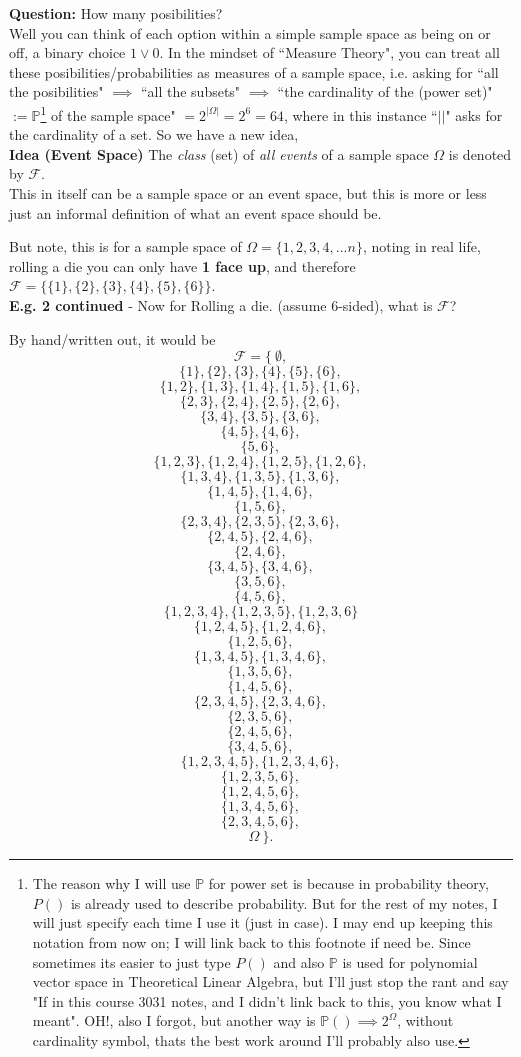 \documentclass[12pt]{book}
\begin{document}
\textbf{Question:} How many posibilities?\\
Well you can think of each option within a simple sample space as being on or off, a binary choice ${1 \lor 0}$. 
In the mindset of ``Measure Theory", you can treat all these posibilities/probabilities as measures of a sample space, i.e. asking for ``all the posibilities" $\implies{}$ ``all the subsets" $\implies{}$ 
``the cardinality of the (power set)"$:=\mathbb{P}$\footnote{The reason why I will use $\mathbb{P}$ for power set is because in probability theory, $P()$ is already used to describe probability. But for the rest of my notes, I will just specify each time I use it (just in case). I may end up keeping this notation from now on; I will link back to this footnote if need be. Since sometimes its easier to just type $P()$ and also $\mathbb{P}$ is used for polynomial vector space in Theoretical Linear Algebra, but I'll just stop the rant and say "If in this course 3031 notes, and I didn't link back to this, you know what I meant". OH!, also I forgot, but another way is $\mathbb{P}() \implies 2^{\Omega}$, without cardinality symbol, thats the best work around I'll probably also use.
} of the sample space" $=2^{|\Omega|}=2^6=64$, where in this instance ``$||$" asks for the cardinality of a set. 
So we have a new idea, \\

\textbf{Idea (Event Space)} The \textit{class} (set) of \textit{all events} of a sample space $\Omega$ is denoted by $\mathcal{F}$.\\

This in itself can be a sample space or an event space, but this is more or less just an informal definition of what an event space should be.

But note, this is for a sample space of $\Omega = \{ 1,2,3,4,...n \}$, noting in real life, rolling a die you can only have \textbf{1 face up}, and therefore $\mathcal{F}= \{ \{1\}, \{2\}, \{3\}, \{4\}, \{5\}, \{6\} \}$.\\

\noindent \textbf{E.g. 2 continued} - Now for Rolling a die. (assume 6-sided), what is $\mathcal{F}$?

By hand/written out, it would be 
$$\mathcal{F}= \Big\{ ~\emptyset,$$
$$\{1\}, \{2\}, \{3\}, \{4\}, \{5\}, \{6\},$$
$$~$$
$$\{1,2\}, \{1,3\}, \{1,4\}, \{1,5\}, \{1,6\}, $$ 
$$\{2,3\}, \{2,4\}, \{2,5\}, \{2,6\},  $$
$$\{3,4\}, \{3,5\}, \{3,6\},  $$
$$\{4,5\}, \{4,6\},  $$
$$\{5,6\},  $$
$$~$$
$$\{1,2,3\}, \{1,2,4\}, \{1,2,5\}, \{1,2,6\},  $$
$$\{1,3,4\}, \{1,3,5\}, \{1,3,6\}, $$
$$\{1,4,5\}, \{1,4,6\}, $$
$$\{1,5,6\},$$
$$\{2,3,4\}, \{2,3,5\},  \{2,3,6\},  $$
$$\{2,4,5\}, \{2,4,6\},$$
$$\{2,4,6\},$$
$$\{3,4,5\}, \{3,4,6\},$$
$$\{3,5,6\}, $$
$$\{4,5,6\},$$
$$~$$
$$\{1,2,3,4\}, \{1,2,3,5\}, \{1,2,3,6\}$$
$$\{1,2,4,5\}, \{1,2,4,6\},$$
$$\{1,2,5,6\},$$
$$\{1,3,4,5\}, \{1,3,4,6\},$$
$$\{1,3,5,6\},$$
$$\{1,4,5,6\},$$
$$\{2,3,4,5\}, \{2,3,4,6\}, $$
$$\{2,3,5,6\},  $$
$$\{2,4,5,6\}, $$
$$\{3,4,5,6\},$$
$$~$$
$$\{1,2,3,4,5\}, \{1,2,3,4,6\}, $$
$$\{1,2,3,5,6\}, $$
$$\{1,2,4,5,6\}, $$
$$\{1,3,4,5,6\}, $$
$$\{2,3,4,5,6\},$$
$$~$$
$$\Omega ~\Big\}.$$
\end{document}
